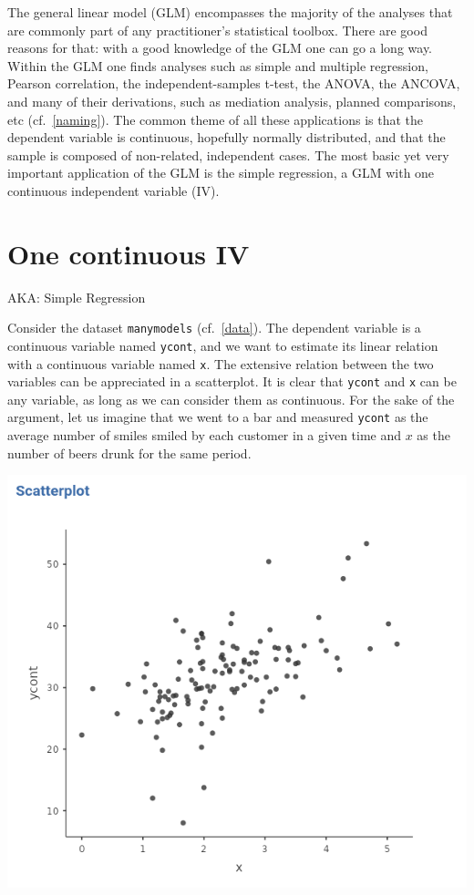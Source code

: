 \documentclass[
]{book}
\begin{document}
The general linear model (GLM) encompasses the majority of the analyses that are commonly part of any practitioner's statistical toolbox. There are good reasons for that: with a good knowledge of the GLM one can go a long way. Within the GLM one finds analyses such as simple and multiple regression, Pearson correlation, the independent-samples t-test, the ANOVA, the ANCOVA, and many of their derivations, such as mediation analysis, planned comparisons, etc (cf.~\ref{naming}). The common theme of all these applications is that the dependent variable is continuous, hopefully normally distributed, and that the sample is composed of non-related, independent cases. The most basic yet very important application of the GLM is the simple regression, a GLM with one continuous independent variable (IV).

\hypertarget{regression}{%
\section{One continuous IV}\label{regression}}

\begin{flushright} AKA: Simple Regression  \end{flushright}

Consider the dataset \texttt{manymodels} (cf.~\ref{data}). The dependent variable is a continuous variable named \texttt{ycont}, and we want to estimate its linear relation with a continuous variable named \texttt{x}. The extensive relation between the two variables can be appreciated in a scatterplot. It is clear that \texttt{ycont} and \texttt{x} can be any variable, as long as we can consider them as continuous. For the sake of the argument, let us imagine that we went to a bar and measured \texttt{ycont} as the average number of smiles smiled by each customer in a given time and \(x\) as the number of beers drunk for the same period.

\includegraphics[width=0.9\linewidth]{bookletpics/2_scatterplot1}
\end{document}
